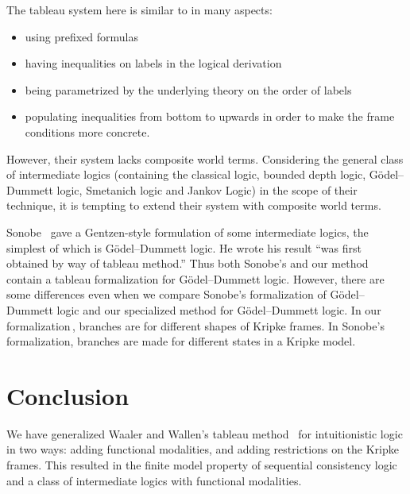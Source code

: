     The tableau system here is similar to \citet{dyckhoff-negri} in many
    aspects:
    \begin{itemize}
     \item using prefixed formulas
     \item having inequalities on labels in the logical derivation
     \item being parametrized by the underlying theory on the order of
	   labels
     \item populating inequalities from bottom to upwards in order to make the
	   frame conditions more concrete.
    \end{itemize}
    However, their system lacks composite world terms.  Considering
    the general class of intermediate logics
    (containing the classical logic, bounded depth logic,
    G\"odel--Dummett logic, Smetanich logic and Jankov Logic) in the scope of their
    technique,
    it is tempting to extend their system with composite world terms.

    Sonobe~\cite{sonobe} gave a Gentzen-style formulation of some
    intermediate logics, the simplest of which is G\"{o}del--Dummett logic.
    He wrote his result ``was first obtained by way of tableau method.''
    Thus both Sonobe's and our method contain a tableau formalization for
    G\"{o}del--Dummett logic.  However, there are some differences even when
    we compare Sonobe's formalization of G\"odel--Dummett logic and our
    specialized method for G\"odel--Dummett logic.
    In our formalization\,\LB, branches are for different shapes of Kripke
    frames.  In Sonobe's formalization, branches are made for different
    states in a Kripke model.

 \section{Conclusion}

 We have generalized Waaler and Wallen's tableau method~\cite{waaler1999tableaux} for intuitionistic
 logic in two ways: adding functional modalities, and adding restrictions on the Kripke frames.
 This resulted in the finite model property of sequential consistency
 logic~\cite{hirailpar} and a class of intermediate logics with
 functional modalities.
